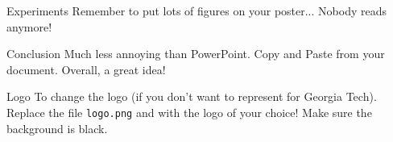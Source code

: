 \documentclass[serif,mathserif,final]{beamer}
\begin{document}
{\begin{frame}{}
\begin{columns}[t]
\begin{column}{0.32\linewidth}
      \begin{block}{Experiments}
        Remember to put lots of figures on your poster... Nobody reads anymore!
      \end{block}

      \begin{block}{Conclusion}
        Much less annoying than PowerPoint.  Copy and Paste from your
        document. Overall, a great idea!
      \end{block}

      \begin{block}{Logo}
        To change the logo (if you don't want to represent for Georgia Tech).
        Replace the file {\tt logo.png} and with the logo of your choice!
        Make sure the background is black.
      \end{block}

    \end{column}%
 
  \end{columns}
\end{frame}
}
\end{document}
